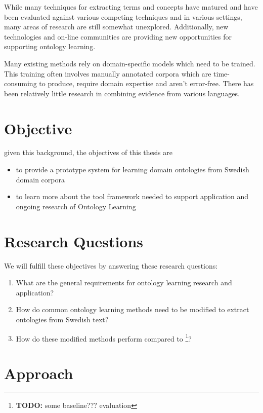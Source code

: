 \documentclass[a4paper]{report}
\newcommand{\todo}[1]{\footnote{{\color{red} {\bf TODO:} #1}}}
\begin{document}
While many techniques for extracting terms and concepts have matured and have been evaluated against various competing techniques and in various settings, many areas of research are still somewhat unexplored.
Additionally, new technologies and on-line communities are providing new opportunities for supporting ontology learning.

Many existing methods rely on domain-specific models which need to be trained.
This training often involves manually annotated corpora which are time-consuming to produce, require domain expertise and aren't error-free.
There has been relatively little research in combining evidence from various languages.

\section{Objective}

given this background, the objectives of this thesis are

\begin{itemize}
  \item to provide a prototype system for learning domain ontologies from Swedish domain corpora
  \item to learn more about the tool framework needed to support application and ongoing research of Ontology Learning
\end{itemize}

\section{Research Questions}

We will fulfill these objectives by answering these research questions:

\begin{enumerate}
  \item{What are the general requirements for ontology learning research and application?}
  \item{How do common ontology learning methods need to be modified to extract ontologies from Swedish text?}
  \item{How do these modified methods perform compared to \todo{some baseline??? evaluation}?}
\end{enumerate}

\section{Approach}
\end{document}
